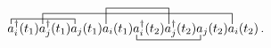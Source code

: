 \documentclass[10pt]{article}
\begin{document}
\begin{align*}\contraction{}{a}{{}^{\dagger}_i(t_1)a^{\dagger}_j(t_1)}{a} 
\contraction[2ex]{a^{\dagger}_i(t_1)}{a}{
{}^{\dagger}_j(t_1)a_j(t_1)a_i(t_1)
a^{\dagger}_i(t_2)a^{\dagger}_j(t_2)a_j(t_2)}{a}
\contraction[3ex]{a^{\dagger}_i(t_1)
a^{\dagger}_j(t_1)a_j(t_1)}{a}{{}_i(t_1)
a^{\dagger}_i(t_2)}{a}
\bcontraction{a^{\dagger}_i(t_1)
a^{\dagger}_j(t_1)a_j(t_1)a_i(t_1)}
{a}{{}^{\dagger}_i(t_2)a^{\dagger}_j(t_2)}{a}
a^{\dagger}_i(t_1)a^{\dagger}_j(t_1)a_j(t_1)a_i(t_1) 
a^{\dagger}_i(t_2)a^{\dagger}_j(t_2)a_j(t_2)a_i(t_2)\,.\end{align*}
\end{document}

